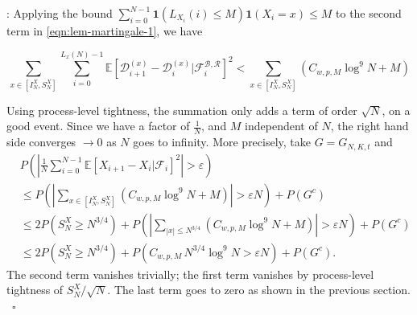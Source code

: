 \documentclass[twoside,12pt,a4paper]{article}
\numberwithin{equation}{section}
\newenvironment{proof}[1][Proof]{{\sc #1}:}{~\hfill $\square$}
\begin{document}
\begin{proof}[Proof of Lemma~\ref{lm: control of martingale}]
		Applying the bound $\sum_{i = 0}^{N-1} \mathbf{1}\left( L_{X_i}(i) \le M \right) \mathbf{1}(X_i = x) \le  M$ to the second term in \eqref{eqn:lem-martingale-1}, we have
		
		\begin{equation*}
			\sum_{x \in \left[ I_N^X, S_N^X \right]} \sum_{i = 0}^{L_x(N) - 1} \mathbb{E}\left[ \mathcal{D}_{i+1}^{(x)} - \mathcal{D}_i^{(x)} | \mathcal{F}_{i}^{\mathcal{B}, \mathcal{R}} \right]^2 
			< \sum_{x \in \left[ I_N^X, S_N^X \right]} (C_{w, p, M} \log^9 N +M )
		\end{equation*}
		
		Using process-level tightness, the summation only adds a term of order $\sqrt{N}$, on a good event. Since we have a factor of $\frac{1}{N}$, and $M$ independent of $N$, the right hand side converges $\to 0$ as $N$ goes to infinity. More precisely, take $G = G_{N, K, t}$ and
		\begin{align*}
			&P\left( \left| \frac{1}{N} \sum_{i = 0}^{N-1} \mathbb{E}\left[ X_{i+1} - X_i | \mathcal{F}_i \right]^2  \right|  > \varepsilon \right)\\
			&\le P\left( \left| \sum_{x \in \left[ I_N^X, S_N^X \right]} (C_{w, p, M} \log^9 N +M ) \right| > \varepsilon  N \right) + P(G^c) \\
			&\le 2 P\left( S_N^X \ge N^{3 / 4} \right) + P\left(  \left| \sum_{|x| \le N^{3 / 4}} (C_{w, p, M} \log^9 N +M ) \right| > \varepsilon  N  \right) +P(G^c)  \\
			&\le 2 P\left( S_N^X \ge N^{3 / 4} \right) + P\left(  C_{w, p, M} \, N^{3 / 4} \log^9 N > \varepsilon  N  \right) + P(G^c)
			.\end{align*}
		The second term vanishes trivially; the first term vanishes by process-level tightness of $S_N^X / \sqrt{N} $. The last term goes to zero as shown in the previous section.
	\end{proof}
	
	
	
\end{document}
